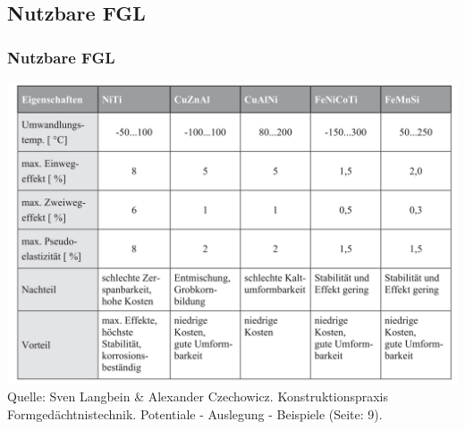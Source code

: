 \subsection{Nutzbare FGL}
\begin{frame}[c]\frametitle{Nutzbare FGL}
	\centering
	\includegraphics[height=0.5\textwidth]{medien/fgl_tabelle.png}
	\\
	\tiny{Quelle: Sven Langbein \& Alexander Czechowicz. Konstruktionspraxis
	Formgedächtnistechnik. Potentiale - Auslegung - Beispiele (Seite: 9).}
\end{frame}
